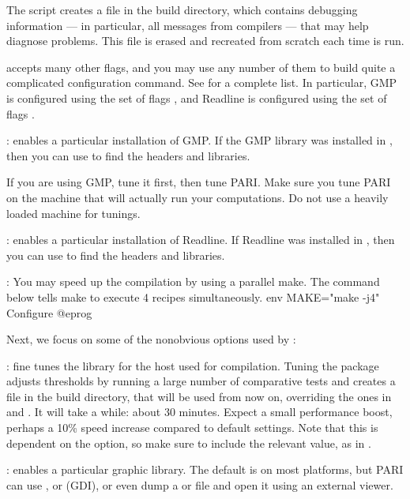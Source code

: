 The  script creates a file  in the build
directory, which contains debugging information --- in particular, all
messages from compilers ---  that may help diagnose problems. This file
is erased and recreated from scratch each time  is run.

 accepts many other flags, and you may use any number of them
to build quite a complicated configuration command. See  for a complete list. In particular, GMP is configured using the set
of flags , and Readline is configured using the set
of flags .

: enables a particular installation of GMP. If the GMP
library was installed in , then you can use
 to find the headers and libraries.

If you are using GMP, tune it first, then tune PARI. Make sure you tune PARI
on the machine that will actually run your computations. Do not use a heavily
loaded machine for tunings.

: enables a particular installation of Readline. If
Readline was installed in , then you can use
 to find the headers and libraries.

: You may speed up the compilation by using a parallel make.
The command below tells make to execute 4 recipes simultaneously.
\bprog
  env MAKE="make -j4" Configure
@eprog

Next, we focus on some of the nonobvious options used by :

: fine tunes the library for the host used for compilation.
Tuning the package adjusts thresholds by running a large number of comparative
tests and creates a file  in the build directory, that will be
used from now on, overriding the ones in  and
. It will take a while: about 30 minutes. Expect a small
performance boost, perhaps a 10\% speed increase compared to default settings.
Note that this is dependent on the  option, so make sure to include
the relevant value, as in .

: enables a particular graphic library.
The default is  on most platforms, but PARI can use
,  or  (GDI), or even dump a 
or  file and open it using an external viewer.

